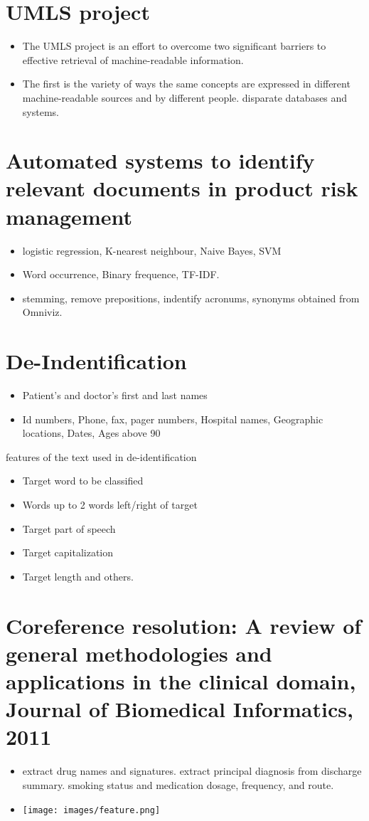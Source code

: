 \documentclass[pdftext,twoside,11pt]{article}
\begin{document}
\section{UMLS project}
\label{sec:intro} 
\begin{itemize}
\item The UMLS project is an effort to overcome two significant
 barriers to effective retrieval of machine-readable information. 
\item  The first is the variety of ways the same concepts are expressed
        in different machine-readable sources and by different people. disparate databases and systems.
\end{itemize}

\section{Automated systems to identify relevant
documents in product risk management}
\label{sec:intro} 
\begin{itemize}
\item  logistic regression, K-nearest neighbour, Naive Bayes, SVM
\item  Word occurrence, Binary frequence, TF-IDF. 
\item  stemming, remove prepositions, indentify acronums, synonyms obtained from Omniviz.
\end{itemize}
\section{De-Indentification}
\label{sec:intro} 
\begin{itemize}
\item  Patient's and doctor's first and last names 
\item  Id numbers, Phone, fax, pager numbers, Hospital names, Geographic locations, Dates, Ages above 90 
\end{itemize}
features of the text used in de-identification
\begin{itemize}
\item Target word to be classified
\item Words up to 2 words left/right of target
\item Target part of speech
\item Target capitalization
\item Target length and others.  
\end{itemize}
\section{Coreference resolution: A review of general methodologies and applications
in the clinical domain, Journal of Biomedical Informatics, 2011}
\label{sec:intro} 
\begin{itemize}
\item  extract drug names and signatures. extract principal diagnosis from discharge summary.
       smoking status and medication dosage, frequency, and route.
\item   \texttt{[image: images/feature.png]}
\end{itemize}
\end{document}

